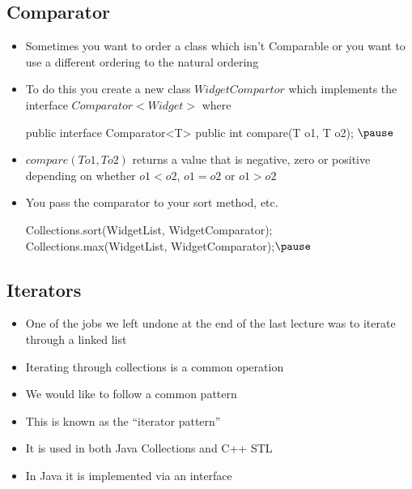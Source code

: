 
\begin{slide}
\section[-2]{Comparator}

\begin{PauseHighLight}
  \begin{itemize}
  \item Sometimes you want to order a class which isn't Comparable or
    you want to use a different ordering to the natural ordering\pause
  \item To do this you create a new class \jl$WidgetCompartor$ which
    implements the interface \jl$Comparator<Widget>$ where
    \begin{java}
      public interface Comparator<T>
      {
         public int compare(T o1, T o2);
      }$\pause$
    \end{java}
  \item \jl$compare(T o1, To2)$ returns a value that is negative, zero
    or positive depending on whether $o1<o2$, $o1=o2$ or $o1>o2$\pause
  \item You pass the comparator to your sort method, etc.
    \begin{java}
      Collections.sort(WidgetList, WidgetComparator);
      Collections.max(WidgetList, WidgetComparator);$\pause$
    \end{java}
  \end{itemize}
\end{PauseHighLight}

\end{slide}


\Outline

\begin{slide}
\section[-1]{Iterators}

\begin{PauseHighLight}
  \begin{itemize}
  \item One of the jobs we left undone at the end of the last lecture
    was to iterate through a linked list\pause
  \item Iterating through collections is a common operation\pause
  \item We would like to follow a common pattern\pause
  \item This is known as the ``iterator pattern''\pause
  \item It is used in both Java Collections and C++ STL\pause
  \item In Java it is implemented via an interface\pause
\end{itemize}
\end{PauseHighLight}
\end{slide}

